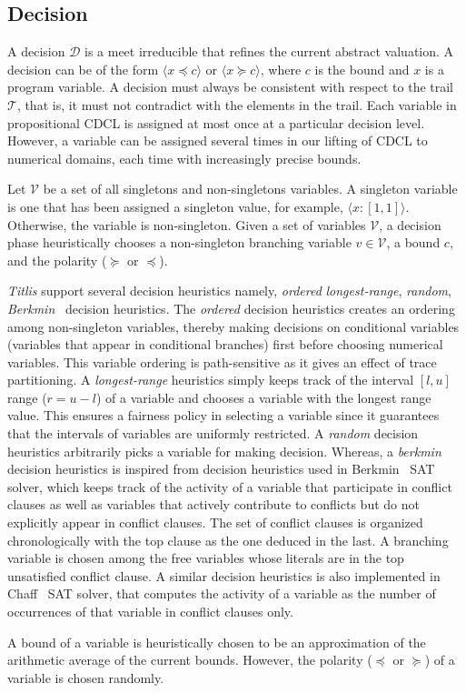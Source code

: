 \subsection{Decision}
A decision $\mathcal{D}$ is a meet irreducible that refines the 
current abstract valuation.  A decision can be of the form 
$\langle x \preceq c \rangle$ or $\langle x \succeq c \rangle$, 
where $c$ is the bound and $x$ is a program variable.  A 
decision must always be consistent with respect to the 
trail $\mathcal{T}$, that is, it must not contradict with 
the elements in the trail.  Each variable in propositional CDCL 
is assigned at most once at a particular decision level.  However, 
a variable can be assigned several times in our lifting of CDCL to 
numerical domains, each time with increasingly precise bounds.  

Let $\mathcal{V}$ be a set of all singletons and non-singletons 
variables.  A singleton variable is one that has been assigned a 
singleton value, for example, $\langle x:[1,1] \rangle$.  Otherwise, 
the variable is non-singleton.  Given a set of variables $\mathcal{V}$, 
a decision phase heuristically chooses a non-singleton branching 
variable $v \in \mathcal{V}$, a bound $c$, and the polarity ($\succeq$ or 
$\preceq$).  

{\em Titlis} support several decision heuristics namely, {\em ordered} 
{\em longest-range}, {\em random}, {\em Berkmin}~\cite{} decision heuristics.  
The {\em ordered} decision heuristics creates an ordering among non-singleton 
variables, thereby making decisions on conditional variables (variables that 
appear in conditional branches) first before choosing numerical variables.  
This variable ordering is path-sensitive as it gives an effect of trace
partitioning.  A {\em longest-range} heuristics simply keeps track of the
interval $[l,u]$ range ($r=u-l$) of a variable and chooses a variable with 
the longest range value.  This ensures a fairness policy in selecting a 
variable since it guarantees that the intervals of variables are uniformly 
restricted.  A {\em random} decision heuristics arbitrarily picks a variable 
for making decision.  Whereas, a {\em berkmin} decision heuristics is inspired 
from decision heuristics used in Berkmin~\cite{eugoldberg07} SAT solver, which 
keeps track of the activity of a variable that participate in conflict clauses 
as well as variables that actively contribute to conflicts but do not explicitly 
appear in conflict clauses.  The set of conflict clauses is organized 
chronologically with the top clause as the one deduced in the last.  A 
branching variable is chosen among the free variables whose literals are 
in the top unsatisfied conflict clause.  A similar decision heuristics is 
also implemented in Chaff~\cite{chaff} SAT solver, that computes the activity 
of a variable as the number of occurrences of that variable in conflict 
clauses only.  

A bound of a variable is heuristically chosen to be an approximation of the 
arithmetic average of the current bounds.  However, the polarity ($\preceq$ or
$\succeq$) of a variable is chosen randomly.  
